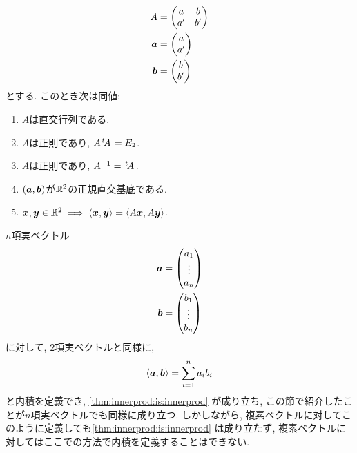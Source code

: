 \begin{prop}
  \begin{align*}
    A&=
    \begin{pmatrix}
      a&b\\
      a'&b'
    \end{pmatrix}\\
    \boldsymbol{a}&=
    \begin{pmatrix}
      a\\
      a'
    \end{pmatrix}\\
    \boldsymbol{b}&=
    \begin{pmatrix}
      b\\
      b'
    \end{pmatrix}
  \end{align*}
  とする.  このとき次は同値:
  \begin{enumerate}
  \item\label{thm:ortho:char:item:ortho}
    $A$は直交行列である.
  \item\label{thm:ortho:char:item:ortho2}
    $A$は正則であり, $A{\left.^{t}\!A\right.}=E_2$.
  \item\label{thm:ortho:char:item:transposeisinverse}
    $A$は正則であり, $A^{-1}={\left.^{t}\!A\right.}$.
  \item\label{thm:ortho:char:item:orthonormalbasis}
    $(\boldsymbol{a},\boldsymbol{b})$が$\mathbb{R}^2$の正規直交基底である.
  \item\label{thm:ortho:char:item:preserve}
    $\boldsymbol{x},\boldsymbol{y}\in \mathbb{R}^2\implies \braket{\boldsymbol{x},\boldsymbol{y}}=\braket{A\boldsymbol{x},A\boldsymbol{y}}$.
  \end{enumerate}
\end{prop}

\begin{remark}
  $n$項実ベクトル
  \begin{align*}
    \boldsymbol{a}&=\begin{pmatrix}a_1\\\vdots\\a_n\end{pmatrix}\\
    \boldsymbol{b}&=\begin{pmatrix}b_1\\\vdots\\b_n\end{pmatrix}
  \end{align*}
  に対して, $2$項実ベクトルと同様に,
  \begin{align*}
    \Braket{\boldsymbol{a},\boldsymbol{b}}=\sum_{i=1}^{n}a_ib_i
  \end{align*}
  と内積を定義でき,
  \cref{thm:innerprod:is:innerprod}
  が成り立ち, 
  この節で紹介したことが$n$項実ベクトルでも同様に成り立つ.
  しかしながら,
  複素ベクトルに対してこのように定義しても\cref{thm:innerprod:is:innerprod}
  は成り立たず,
  複素ベクトルに対してはここでの方法で内積を定義することはできない.
\end{remark}

